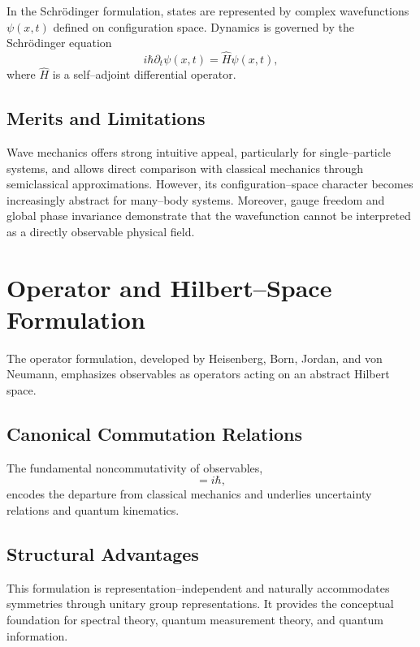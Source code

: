 \documentclass[11pt]{article}
\begin{document}
In the Schrödinger formulation, states are represented by complex wavefunctions $\psi(x,t)$ defined on configuration space. Dynamics is governed by the Schrödinger equation
\begin{equation}
 i\hbar \partial_t \psi(x,t) = \hat{H} \psi(x,t),
\end{equation}
where $\hat{H}$ is a self--adjoint differential operator.

\subsection{Merits and Limitations}

Wave mechanics offers strong intuitive appeal, particularly for single--particle systems, and allows direct comparison with classical mechanics through semiclassical approximations. However, its configuration--space character becomes increasingly abstract for many--body systems. Moreover, gauge freedom and global phase invariance demonstrate that the wavefunction cannot be interpreted as a directly observable physical field.

\section{Operator and Hilbert--Space Formulation}

The operator formulation, developed by Heisenberg, Born, Jordan, and von Neumann, emphasizes observables as operators acting on an abstract Hilbert space.

\subsection{Canonical Commutation Relations}

The fundamental noncommutativity of observables,
\begin{equation}
 [\hat{x}, \hat{p}] = i\hbar,
\end{equation}
encodes the departure from classical mechanics and underlies uncertainty relations and quantum kinematics.

\subsection{Structural Advantages}

This formulation is representation--independent and naturally accommodates symmetries through unitary group representations. It provides the conceptual foundation for spectral theory, quantum measurement theory, and quantum information.
\end{document}
